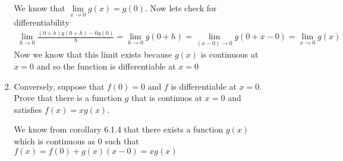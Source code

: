 \documentclass[letterpaper]{article}
\begin{document}
\begin{enumerate}
\begin{enumerate}
\begin{enumerate}
    We know that $\lim\limits_{x\to0}g(x)=g(0)$. Now lets check for differentiability
    \begin{align*}
      \lim_{h\to0}\frac{(0+h)g(0+h)-0g(0)}{h}=\lim_{h\to0}g(0+h)=\lim_{(x-0)\to0}g(0+x-0)=\lim_{x\to0}g(x)
    \end{align*}
    Now we know that this limit exists because $g(x)$ is continuous at $x=0$ and so the function is differentiable at $x=0$
    \item
    Conversely, suppose that $f(0)=0$ and $f$ is differentiable at $x=0$. Prove that there is a function $g$ that is continuos at $x=0$ and satisfies $f(x)=xg(x)$.

    We know from corollary 6.1.4 that there exists a function $g(x)$ which is continuous as $0$ such that $f(x)=f(0)+g(x)(x-0)=xg(x)$
    \end{enumerate}
  \end{enumerate}
\end{enumerate}
\end{document}
